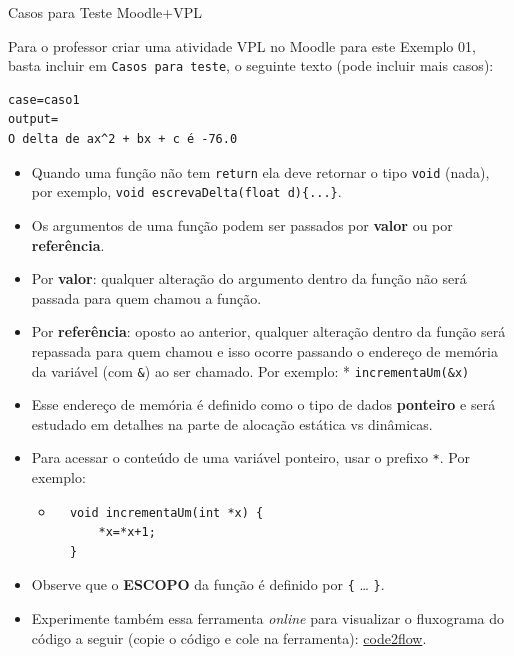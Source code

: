 \documentclass[12pt,a4paper]{article}
\begin{document}
    Casos para Teste Moodle+VPL

Para o professor criar uma atividade VPL no Moodle para este Exemplo 01,
basta incluir em \texttt{Casos\ para\ teste}, o seguinte texto (pode
incluir mais casos):

\begin{verbatim}
case=caso1
output= 
O delta de ax^2 + bx + c é -76.0
\end{verbatim}

    \begin{itemize}
\item
  Quando uma função não tem \texttt{return} ela deve retornar o tipo
  \texttt{void} (nada), por exemplo,
  \texttt{void\ escrevaDelta(float\ d)\{...\}}.
\item
  Os argumentos de uma função podem ser passados por \textbf{valor} ou
  por \textbf{referência}.
\item
  Por \textbf{valor}: qualquer alteração do argumento dentro da função
  não será passada para quem chamou a função.
\item
  Por \textbf{referência}: oposto ao anterior, qualquer alteração dentro
  da função será repassada para quem chamou e isso ocorre passando o
  endereço de memória da variável (com \texttt{\&}) ao ser chamado. Por
  exemplo: * \texttt{incrementaUm(\&x)}
\item
  Esse endereço de memória é definido como o tipo de dados
  \textbf{ponteiro} e será estudado em detalhes na parte de alocação
  estática vs dinâmicas.
\item
  Para acessar o conteúdo de uma variável ponteiro, usar o prefixo
  \texttt{*}. Por exemplo:

  \begin{itemize}
  \item
\begin{verbatim}
  void incrementaUm(int *x) {
      *x=*x+1;
  }
\end{verbatim}
  \end{itemize}
\item
  Observe que o \textbf{ESCOPO} da função é definido por \texttt{\{}
  \ldots{} \texttt{\}}.
\item
  Experimente também essa ferramenta \emph{online} para visualizar o
  fluxograma do código a seguir (copie o código e cole na ferramenta):
  \href{https://app.code2flow.com/}{code2flow}.
\end{itemize}
\end{document}
